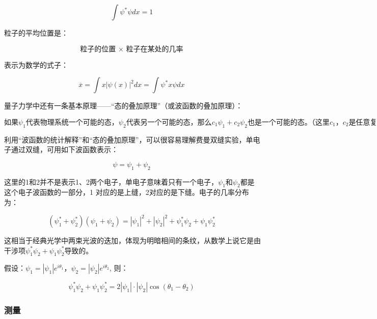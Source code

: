 \begin{equation}
\int \psi^* \psi dx =1~
\end{equation}

粒子的平均位置是：

\begin{equation}
\text{粒子的位置 $\times$ 粒子在某处的几率}~
\end{equation}

表示为数学的式子：

\begin{equation}
\overline{x} = \int x | \psi(x) |^2 dx = \int \psi^*  x \psi  d x~
\end{equation}

量子力学中还有一条基本原理——“态的叠加原理”（或波函数的叠加原理）：

\begin{equation}
\text{如果$\psi_1$代表物理系统一个可能的态，$\psi_2$代表另一个可能的态，那么$c_1\psi_1 + c_2\psi_2$也是一个可能的态。（这里$c_1$，$c_2$是任意复数）}~
\end{equation}

利用“波函数的统计解释”和“态的叠加原理”，可以很容易理解费曼双缝实验，单电子通过双缝，可用如下波函数表示：

\begin{equation}
\psi  = \psi_1 +  \psi_2~
\end{equation}

这里的1和2并不是表示1、2两个电子，单电子意味着只有一个电子，$\psi_1$和$\psi_2$都是这个电子波函数的一部分，1 对应的是上缝，2对应的是下缝。电子的几率分布为：

\begin{equation}
\left( \psi_1^* + \psi_2^*  \right) \left( \psi_1 + \psi_2  \right) = |\psi_1|^2 + |\psi_2|^2 + \psi_1^*\psi_2 +
\psi_1\psi_2^*~
\end{equation}

这相当于经典光学中两束光波的迭加，体现为明暗相间的条纹，从数学上说它是由干涉项$\psi_1^*\psi_2 + \psi_1\psi_2^*$导致的。

假设：$\psi_1 = |\psi_1| e^{i \theta_1}$，$\psi_2 = |\psi_2| e^{i \theta_2}$, 则：

\begin{equation}
\psi_1^* \psi_2 + \psi_1 \psi_2^*  = 2 |\psi_1 | \cdot | \psi_2 | \cos (\theta_1 -\theta_2)~
\end{equation}

\subsubsection{测量}


